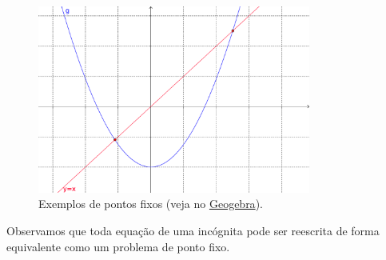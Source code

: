 \begin{figure}[h!]
  \centering
  \includegraphics[width=0.8\textwidth]{./cap_eq1d/dados/fig_pfixo/fig_pfixo}
  \caption{Exemplos de pontos fixos (veja no \href{https://github.com/phkonzen/notas/blob/master/src/MatematicaNumerica/cap_eq1d/dados/fig_pfixo/fig_pfixo.ggb}{Geogebra}).}
  \label{fig:pfixo}
\end{figure}

Observamos que toda equação de uma incógnita pode ser reescrita de forma equivalente como um problema de ponto fixo.

